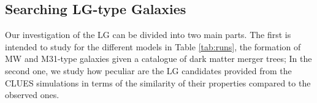 \documentclass[usenatbib]{mn2e}
\begin{document}
%
%
% 
\subsection{Searching LG-type Galaxies}
\label{sec:method:finding-lg}
Our investigation of the LG can be divided into two main parts. The first is intended to study  for the  different models in Table \ref{tab:runs}, the formation
 of MW  and M31-type galaxies given a catalogue of dark matter merger trees; In the second one, we study how peculiar are the LG candidates provided from the 
CLUES simulations in terms of the similarity of their properties compared to the observed ones.
\end{document}
